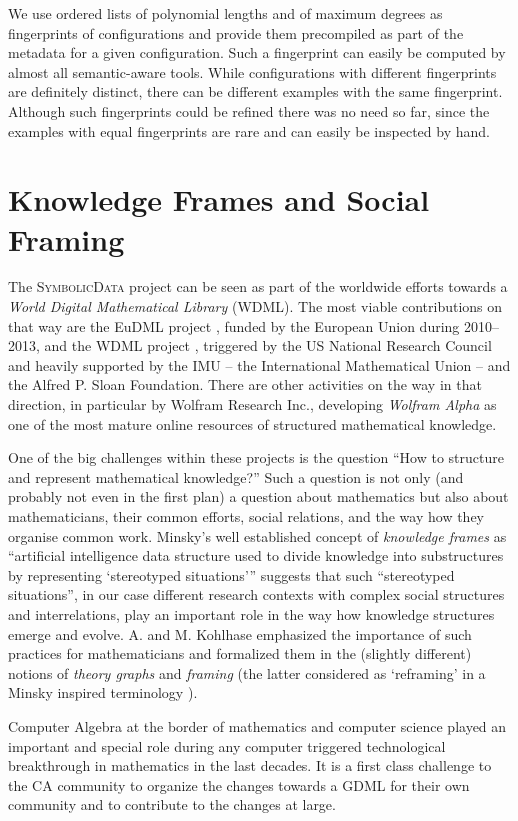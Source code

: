 \documentclass[a4paper,11pt]{article}
\def\Ueberschrift#1#2{\section{#1}}
\def\SD{\textsc{SymbolicData}}
\begin{document}
\begin{multicols}{2}
We use ordered lists of polynomial lengths and of maximum degrees as
fingerprints of configurations and provide them precompiled as part of
the metadata for a given configuration.  Such a fingerprint can easily
be computed by almost all semantic-aware tools.  While configurations
with different fingerprints are definitely distinct, there can be
different examples with the same fingerprint.  Although such
fingerprints could be refined there was no need so far, since the
examples with equal fingerprints are rare and can easily be inspected
by hand.

\Ueberschrift{Knowledge Frames and Social Framing}{Social Framing}

The {\SD} project can be seen as part of the worldwide efforts towards
a \emph{World Digital Mathematical Library} (WDML). The most viable
contributions on that way are the EuDML project \cite{EuDML}, funded
by the European Union during 2010--2013, and the WDML project
\cite{WDML}, triggered by the US National Research Council and heavily
supported by the IMU -- the International Mathematical Union -- and
the Alfred P. Sloan Foundation.  There are other activities on the way
in that direction, in particular by Wolfram Research Inc., developing
\emph{Wolfram Alpha} as one of the most mature online resources of
structured mathematical knowledge.

One of the big challenges within these projects is the question ``How
to structure and represent mathematical knowledge?'' Such a question
is not only (and probably not even in the first plan) a question about
mathematics but also about mathematicians, their common efforts,
social relations, and the way how they organise common work.  Minsky's
well established concept of \emph{knowledge frames} as ``artificial
intelligence data structure used to divide knowledge into
substructures by representing {`stereotyped situations'}''
\cite{frame} suggests that such ``stereotyped situations'', in our
case different research contexts with complex social structures and
interrelations, play an important role in the way how knowledge
structures emerge and evolve.  A. and M. Kohlhase \cite{kohlhase}
emphasized the importance of such practices for mathematicians and
formalized them in the (slightly different) notions of \emph{theory
  graphs} and \emph{framing} (the latter considered as `reframing' in
a Minsky inspired terminology \cite{reframing}).

Computer Algebra at the border of mathematics and computer science
played an important and special role during any computer triggered
technological breakthrough in mathematics in the last decades. It is
a first class challenge to the CA community to organize the changes
towards a GDML for their own community and to contribute to the
changes at large.


\end{multicols}
\end{document}
